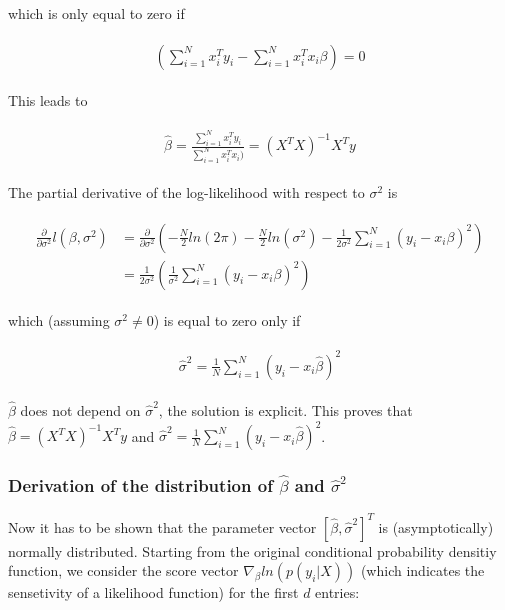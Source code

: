 \documentclass{article}
\begin{document}
which is only equal to zero if

\begin{align}
\begin{aligned}
(\sum_{i=1}^{N}x_i^Ty_i - \sum_{i=1}^{N}x_i^Tx_i\beta) = 0
\end{aligned}
\end{align}

This leads to 

\begin{align}
\begin{aligned}
\hat\beta = \frac{\sum_{i=1}^{N}x_i^Ty_i}{\sum_{i=1}^{N}x_i^Tx_i)} = (X^TX)^{-1}X^Ty
\end{aligned}
\end{align}

The partial derivative of the log-likelihood with respect to $\sigma^2$ is

\begin{align}
\begin{aligned}
\frac{\partial}{\partial\sigma^2}l(\beta, \sigma^2) &= \frac{\partial}{\partial\sigma^2}( -\frac{N}{2}ln(2\pi) - \frac{N}{2}ln(\sigma^2) - \frac{1}{2\sigma^2}\sum_{i=1}^{N}(y_i - x_i\beta)^2)\\
 									  &= \frac{1}{2\sigma^2}(\frac{1}{\sigma^2}\sum_{i=1}^{N}(y_i-x_i\beta)^2)
\end{aligned}
\end{align}

which (assuming $\sigma^2 \not= 0$) is equal to zero only if

\begin{align}
\begin{aligned}
\hat\sigma^2 = \frac{1}{N} \sum_{i=1}^{N}(y_i-x_i\hat\beta)^2
\end{aligned}
\end{align}

$\hat\beta$ does not depend on $\hat\sigma^2$, the solution is explicit. This proves that $\hat\beta = (X^TX)^{-1}X^Ty$ and $\hat\sigma^2 = \frac{1}{N} \sum_{i=1}^{N}(y_i-x_i\hat\beta)^2$.\\

\subsubsection*{Derivation of the distribution of $\hat\beta$ and $\hat\sigma^2$}

Now it has to be shown that the parameter vector $\left[\hat\beta, \hat\sigma^2\right]^T$ is (asymptotically) normally distributed. Starting from the original conditional probability densitiy function, we consider the score vector $\nabla_{\beta}ln(p(y_i|X))$ (which indicates the sensetivity of a likelihood function) for the first $d$ entries:
\end{document}
